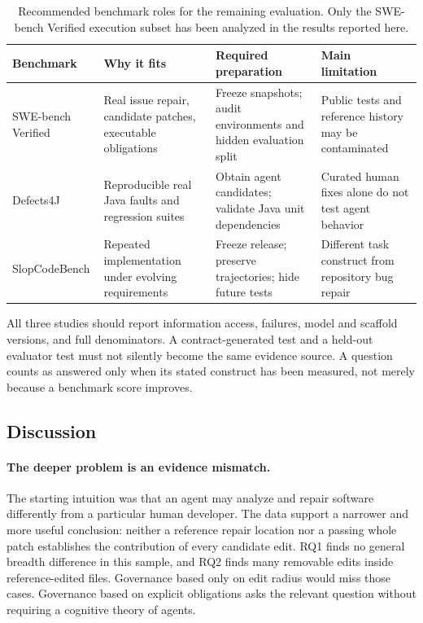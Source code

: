 \documentclass[a4paper,fleqn]{cas-sc}
\begin{document}
\begin{table}[pos=htbp]
\caption{Recommended benchmark roles for the remaining evaluation. Only the SWE-bench Verified execution subset has been analyzed in the results reported here.}
\label{tab:benchmarks}
\centering\small
\begin{tabularx}{\linewidth}{lXXX}
\toprule
Benchmark & Why it fits & Required preparation & Main limitation \\
\midrule
SWE-bench Verified & Real issue repair, candidate patches, executable obligations & Freeze snapshots; audit environments and hidden evaluation split & Public tests and reference history may be contaminated \\
Defects4J & Reproducible real Java faults and regression suites & Obtain agent candidates; validate Java unit dependencies & Curated human fixes alone do not test agent behavior \\
SlopCodeBench & Repeated implementation under evolving requirements & Freeze release; preserve trajectories; hide future tests & Different task construct from repository bug repair \\
\bottomrule
\end{tabularx}
\end{table}

All three studies should report information access, failures, model and scaffold versions, and full denominators. A contract-generated test and a held-out evaluator test must not silently become the same evidence source. A question counts as answered only when its stated construct has been measured, not merely because a benchmark score improves.

\subsection{Discussion}\label{sec:discussion}

\paragraph{The deeper problem is an evidence mismatch.}
The starting intuition was that an agent may analyze and repair software differently from a particular human developer. The data support a narrower and more useful conclusion: neither a reference repair location nor a passing whole patch establishes the contribution of every candidate edit. RQ1 finds no general breadth difference in this sample, and RQ2 finds many removable edits inside reference-edited files. Governance based only on edit radius would miss those cases. Governance based on explicit obligations asks the relevant question without requiring a cognitive theory of agents.
\end{document}
